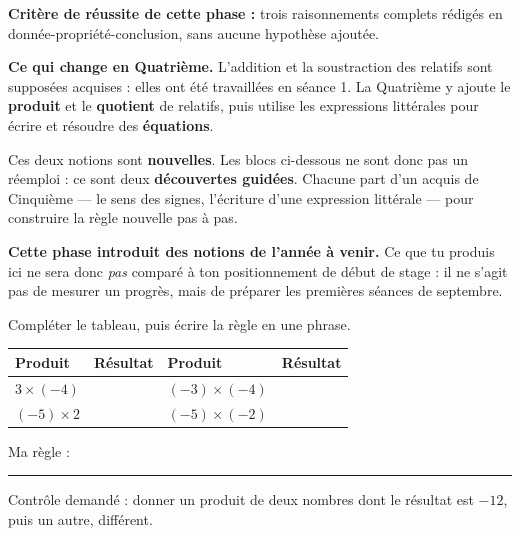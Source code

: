\documentclass[10pt,a4paper]{article}
\begin{document}
\begin{successbox}\textbf{Critère de réussite de cette phase :} trois raisonnements complets rédigés en donnée-propriété-conclusion, sans aucune hypothèse ajoutée.\end{successbox}
\certline
\needspace{62mm}\par\vspace{3mm}

\begin{methodbox}
\textbf{Ce qui change en Quatrième.} L'addition et la soustraction des relatifs sont supposées acquises :
elles ont été travaillées en séance 1. La Quatrième y ajoute le \textbf{produit} et le \textbf{quotient} de
relatifs, puis utilise les expressions littérales pour écrire et résoudre des \textbf{équations}.
\par\smallskip
Ces deux notions sont \textbf{nouvelles}. Les blocs ci-dessous ne sont donc pas un réemploi : ce sont deux
\textbf{découvertes guidées}. Chacune part d'un acquis de Cinquième — le sens des signes, l'écriture d'une
expression littérale — pour construire la règle nouvelle pas à pas.
\end{methodbox}
\begin{warningbox}\small
\textbf{Cette phase introduit des notions de l'année à venir.} Ce que tu produis ici ne sera donc
\emph{pas} comparé à ton positionnement de début de stage : il ne s'agit pas de mesurer un progrès,
mais de préparer les premières séances de septembre.
\end{warningbox}


Compléter le tableau, puis écrire la règle en une phrase.
\par\noindent\begin{tabularx}{\linewidth}{>{\bfseries}p{30mm} X >{\bfseries}p{30mm} X}
\toprule
Produit & Résultat & Produit & Résultat \\
\midrule
$3 \times (-4)$ & & $(-3)\times(-4)$ & \\
$(-5)\times 2$ & & $(-5)\times(-2)$ & \\
\bottomrule
\end{tabularx}
\par\vspace{1mm}
Ma règle : \rule{125mm}{0.32pt}
\par\vspace{1mm}
Contrôle demandé : donner un produit de deux nombres dont le résultat est $-12$, puis un autre, différent.
\end{document}
